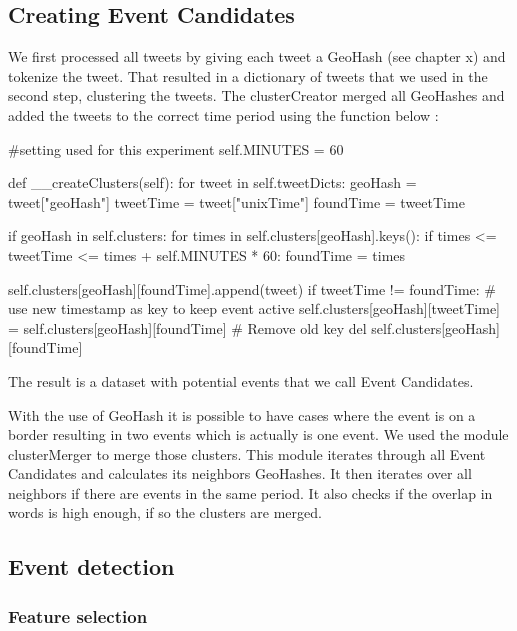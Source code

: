 \documentclass[
10pt, %
a4paper, %
oneside, %
headinclude,footinclude, %
BCOR5mm, %
]{scrartcl}
\begin{document}
\subsection{Creating Event Candidates}
We first processed all tweets by giving each tweet a GeoHash (see chapter x) and tokenize the tweet. That resulted in a dictionary of tweets that we used in the second step, clustering the tweets. The clusterCreator merged all GeoHashes and added the tweets to the correct time period using the function below :
\begin{python}

#setting used for this experiment
self.MINUTES = 60

def __createClusters(self):
        for tweet in self.tweetDicts:
            geoHash = tweet["geoHash"]
            tweetTime = tweet["unixTime"]
            foundTime = tweetTime

            if geoHash in self.clusters:
                for times in self.clusters[geoHash].keys():
                    if times <= tweetTime <= times + self.MINUTES * 60:
                        foundTime = times
            
            self.clusters[geoHash][foundTime].append(tweet)
            if tweetTime != foundTime:
                # use new timestamp as key to keep event active
                self.clusters[geoHash][tweetTime] = self.clusters[geoHash][foundTime]
                # Remove old key
                del self.clusters[geoHash][foundTime] 
\end{python}
The result is a dataset with potential events that we call Event Candidates.

With the use of GeoHash it is possible to have cases where the event is on a border resulting in two events which is actually is one event. We used the module clusterMerger to merge those clusters. This module iterates through all Event Candidates and calculates its neighbors GeoHashes. It then iterates over all neighbors if there are events in the same period. It also checks if the overlap in words is high enough, if so the clusters are merged. 


\subsection{Event detection}
\lipsum[10]

\subsubsection{Feature selection}
\lipsum[12]
\end{document}
